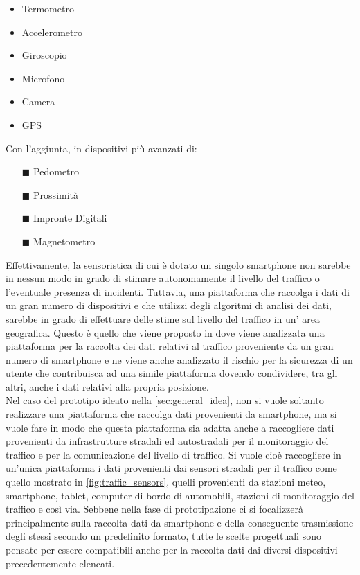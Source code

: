 \begin{itemize}
	\item Termometro
	\item Accelerometro
	\item Giroscopio
	\item Microfono
	\item Camera
	\item GPS
\end{itemize}
Con l'aggiunta, in dispositivi più avanzati di:
\begin{itemize}
	\item[$\blacksquare$] Pedometro
	\item[$\blacksquare$] Prossimità
	\item[$\blacksquare$] Impronte Digitali
	\item[$\blacksquare$] Magnetometro
\end{itemize}
Effettivamente, la sensoristica di cui è dotato un singolo smartphone non sarebbe in nessun modo in grado di stimare autonomamente il livello del traffico o l'eventuale presenza di incidenti. Tuttavia, una piattaforma che raccolga i dati di un gran numero di dispositivi e che utilizzi degli algoritmi di analisi dei dati, sarebbe in grado di effettuare delle stime sul livello del traffico in un' area geografica. Questo è quello che viene proposto in \cite{famous:paper_smartphone_traffic_detection} dove viene analizzata una piattaforma per la raccolta dei dati relativi al traffico proveniente da un gran numero di smartphone e ne viene anche analizzato il rischio per la sicurezza di un utente che contribuisca ad una simile piattaforma dovendo condividere, tra gli altri, anche i dati relativi alla propria posizione.\\
Nel caso del prototipo ideato nella \autoref{sec:general_idea}, non si vuole soltanto realizzare una piattaforma che raccolga dati provenienti da smartphone, ma si vuole fare in modo che questa piattaforma sia adatta anche a raccogliere dati provenienti da infrastrutture stradali ed autostradali per il monitoraggio del traffico e per la comunicazione del livello di traffico. Si vuole cioè raccogliere in un'unica piattaforma i dati provenienti dai sensori stradali per il traffico come quello mostrato in \autoref{fig:traffic_sensors}, quelli provenienti da stazioni meteo, smartphone, tablet, computer di bordo di automobili, stazioni di monitoraggio del traffico e così via. Sebbene nella fase di prototipazione ci si focalizzerà principalmente sulla raccolta dati da smartphone e della conseguente trasmissione degli stessi secondo un predefinito formato, tutte le scelte progettuali sono pensate per essere compatibili anche per la raccolta dati dai diversi dispositivi precedentemente elencati.



